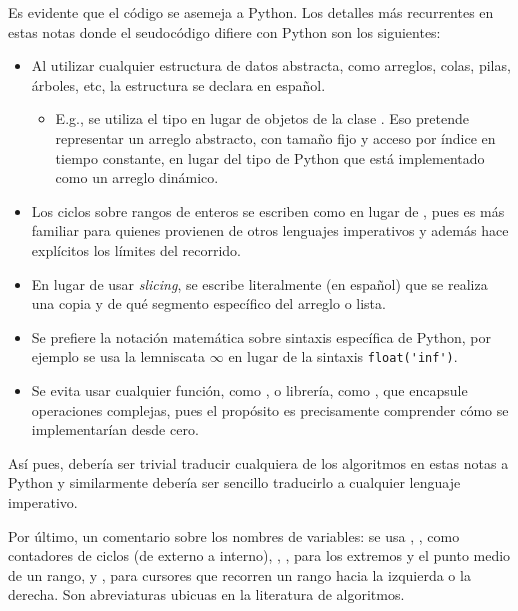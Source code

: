 Es evidente que el código se asemeja a Python. Los detalles más recurrentes en estas notas donde el seudocódigo difiere con Python son los siguientes:
\begin{itemize}
  \item Al utilizar cualquier estructura de datos abstracta, como arreglos, colas, pilas, árboles, etc, la estructura se declara en español.
  \begin{itemize}
    \item E.g., se utiliza el tipo  en lugar de objetos de la clase . Eso pretende representar un arreglo abstracto, con tamaño fijo y acceso por índice en tiempo constante, en lugar del tipo  de Python que está implementado como un arreglo dinámico.
  \end{itemize}
  \item Los ciclos sobre rangos de enteros se escriben como  en lugar de , pues es más familiar para quienes provienen de otros lenguajes imperativos y además hace explícitos los límites del recorrido.
  \item En lugar de usar \textit{slicing}, se escribe literalmente (en español) que se realiza una copia y de qué segmento específico del arreglo o lista.
  \item Se prefiere la notación matemática sobre sintaxis específica de Python, por ejemplo se usa la lemniscata \(\infty\) en lugar de la sintaxis \verb|float('inf')|.
  \item Se evita usar cualquier función, como , o librería, como , que encapsule operaciones complejas, pues el propósito es precisamente comprender cómo se implementarían desde cero.
\end{itemize}

Así pues, debería ser trivial traducir cualquiera de los algoritmos en estas notas a Python y similarmente debería ser sencillo traducirlo a cualquier lenguaje imperativo.

Por último, un comentario sobre los nombres de variables: se usa , ,  como contadores de ciclos (de externo a interno), , ,  para los extremos y el punto medio de un rango, y ,  para cursores que recorren un rango hacia la izquierda o la derecha. Son abreviaturas ubicuas en la literatura de algoritmos.
